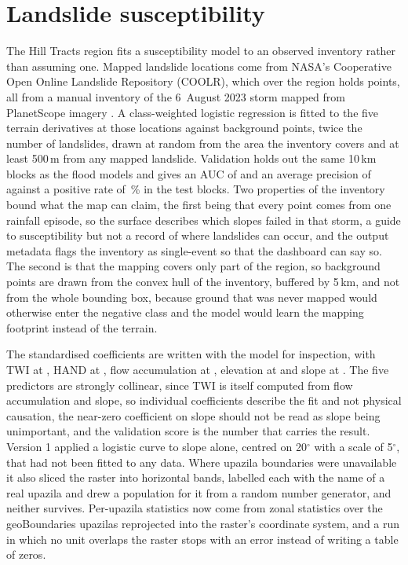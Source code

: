 \documentclass[10pt,a4paper,twocolumn]{article}
\begin{document}
\section{Landslide susceptibility}
\label{sec:landslide}

The Hill Tracts region fits a susceptibility model to an observed inventory rather than assuming one. Mapped landslide locations come from NASA's Cooperative Open Online Landslide Repository (COOLR), which over the region holds \CHTLandslides{} points, all from a manual inventory of the 6~August 2023 storm mapped from PlanetScope imagery \citep{juang2019}. A class-weighted logistic regression is fitted to the five terrain derivatives at those locations against \CHTBackground{} background points, twice the number of landslides, drawn at random from the area the inventory covers and at least 500\,m from any mapped landslide. Validation holds out the same 10\,km blocks as the flood models and gives an AUC of \CHTLSAUC{} and an average precision of \CHTLSAP{} against a positive rate of \CHTLSPositiveRate{}\,\% in the test blocks. Two properties of the inventory bound what the map can claim, the first being that every point comes from one rainfall episode, so the surface describes which slopes failed in that storm, a guide to susceptibility but not a record of where landslides can occur, and the output metadata flags the inventory as single-event so that the dashboard can say so. The second is that the mapping covers only part of the region, so background points are drawn from the convex hull of the inventory, buffered by 5\,km, and not from the whole bounding box, because ground that was never mapped would otherwise enter the negative class and the model would learn the mapping footprint instead of the terrain.

The standardised coefficients are written with the model for inspection, with TWI at \CHTCoefTwi{}, HAND at \CHTCoefHand{}, flow accumulation at \CHTCoefFlowAcc{}, elevation at \CHTCoefElevation{} and slope at \CHTCoefSlope{}. The five predictors are strongly collinear, since TWI is itself computed from flow accumulation and slope, so individual coefficients describe the fit and not physical causation, the near-zero coefficient on slope should not be read as slope being unimportant, and the validation score is the number that carries the result. Version 1 applied a logistic curve to slope alone, centred on 20$^\circ$ with a scale of 5$^\circ$, that had not been fitted to any data. Where upazila boundaries were unavailable it also sliced the raster into horizontal bands, labelled each with the name of a real upazila and drew a population for it from a random number generator, and neither survives. Per-upazila statistics now come from zonal statistics over the geoBoundaries upazilas reprojected into the raster's coordinate system, and a run in which no unit overlaps the raster stops with an error instead of writing a table of zeros.
\end{document}
